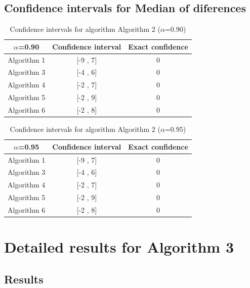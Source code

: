 \documentclass[a4paper,10pt]{article}
\begin{document}
\subsection{Confidence intervals for Median of diferences}

\begin{table}[!htp]
\centering\small
\begin{tabular}{
|c|c|c|}
\hline
 $\alpha$=0.90 & Confidence interval & Exact confidence \\ \hline 
Algorithm 1 & [-9 , 7] & 0\\ \hline 
Algorithm 3 & [-4 , 6] & 0\\ \hline 
Algorithm 4 & [-2 , 7] & 0\\ \hline 
Algorithm 5 & [-2 , 9] & 0\\ \hline 
Algorithm 6 & [-2 , 8] & 0\\ \hline 

\end{tabular}
\caption{Confidence intervals for algorithm Algorithm 2 ($\alpha$=0.90)}
\end{table}
\begin{table}[!htp]
\centering\small
\begin{tabular}{
|c|c|c|}
\hline
 $\alpha$=0.95 & Confidence interval & Exact confidence \\ \hline 
Algorithm 1 & [-9 , 7] & 0\\ \hline 
Algorithm 3 & [-4 , 6] & 0\\ \hline 
Algorithm 4 & [-2 , 7] & 0\\ \hline 
Algorithm 5 & [-2 , 9] & 0\\ \hline 
Algorithm 6 & [-2 , 8] & 0\\ \hline 

\end{tabular}
\caption{Confidence intervals for algorithm Algorithm 2 ($\alpha$=0.95)}
\end{table}

 \clearpage 


\section{Detailed results for Algorithm 3}


\subsection{Results}
\end{document}
